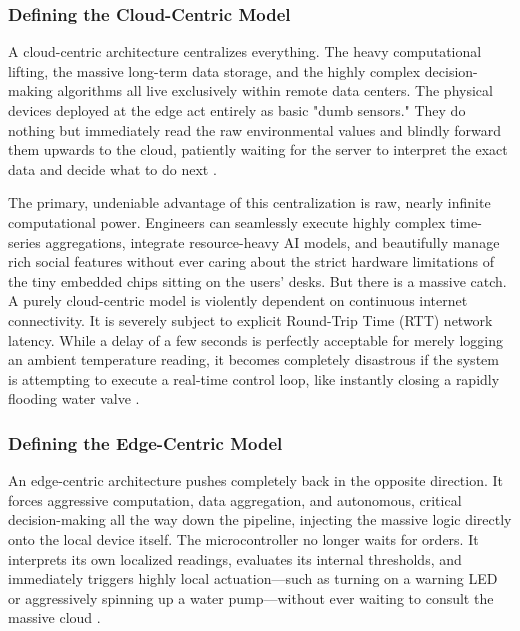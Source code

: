 \subsubsection{Defining the Cloud-Centric Model}

A cloud-centric architecture centralizes everything. The heavy computational lifting, the massive long-term data storage, and the highly complex decision-making algorithms all live exclusively within remote data centers. The physical devices deployed at the edge act entirely as basic "dumb sensors." They do nothing but immediately read the raw environmental values and blindly forward them upwards to the cloud, patiently waiting for the server to interpret the exact data and decide what to do next \cite{digitalocean_edge_vs_cloud, blog_elest_supabase_self_host}.

The primary, undeniable advantage of this centralization is raw, nearly infinite computational power. Engineers can seamlessly execute highly complex time-series aggregations, integrate resource-heavy AI models, and beautifully manage rich social features without ever caring about the strict hardware limitations of the tiny embedded chips sitting on the users' desks. But there is a massive catch. A purely cloud-centric model is violently dependent on continuous internet connectivity. It is severely subject to explicit Round-Trip Time (RTT) network latency. While a delay of a few seconds is perfectly acceptable for merely logging an ambient temperature reading, it becomes completely disastrous if the system is attempting to execute a real-time control loop, like instantly closing a rapidly flooding water valve \cite{nsf_par_10184999, gfg_cloud_computing, digitalocean_edge_vs_cloud, blog_elest_supabase_self_host}.

\subsubsection{Defining the Edge-Centric Model}

An edge-centric architecture pushes completely back in the opposite direction. It forces aggressive computation, data aggregation, and autonomous, critical decision-making all the way down the pipeline, injecting the massive logic directly onto the local device itself. The microcontroller no longer waits for orders. It interprets its own localized readings, evaluates its internal thresholds, and immediately triggers highly local actuation—such as turning on a warning LED or aggressively spinning up a water pump—without ever waiting to consult the massive cloud \cite{scalecomputing_edge_vs_cloud, scalecomputing_edge_devices, blog_elest_supabase_self_host}.

